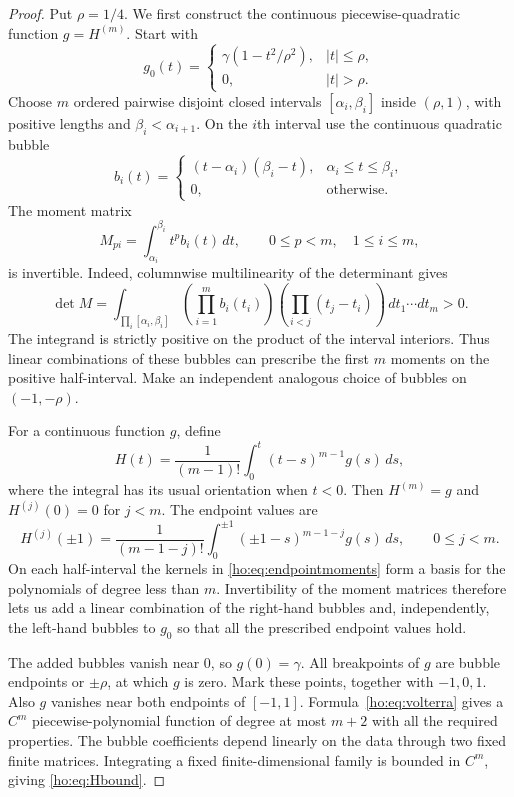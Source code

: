 \documentclass[11pt,reqno]{amsart}
\numberwithin{equation}{section}
\theoremstyle{definition}
\theoremstyle{remark}
\begin{document}
\begin{proof}
Put $\rho=1/4$. We first construct the continuous piecewise-quadratic function $g=H^{(m)}$. Start with
\[
 g_0(t)=
 \begin{cases}
 \gamma(1-t^2/\rho^2),& |t|\le\rho,\\
 0,& |t|>\rho.
 \end{cases}
\]
Choose $m$ ordered pairwise disjoint closed intervals $[\alpha_i,\beta_i]$ inside $(\rho,1)$, with positive lengths and $\beta_i<\alpha_{i+1}$. On the $i$th interval use the continuous quadratic bubble
\[
 b_i(t)=
 \begin{cases}
 (t-\alpha_i)(\beta_i-t),&\alpha_i\le t\le\beta_i,\\
 0,&\text{otherwise}.
 \end{cases}
\]
The moment matrix
\[
 M_{pi}=\int_{\alpha_i}^{\beta_i}t^p b_i(t)\,dt,
 \qquad 0\le p<m,\quad 1\le i\le m,
\]
is invertible. Indeed, columnwise multilinearity of the determinant gives
\begin{equation}\label{ho:eq:momentdet}
 \det M=\int_{\prod_i[\alpha_i,\beta_i]}
 \left(\prod_{i=1}^m b_i(t_i)\right)
 \left(\prod_{i<j}(t_j-t_i)\right)\,dt_1\cdots dt_m>0.
\end{equation}
The integrand is strictly positive on the product of the interval interiors. Thus linear combinations of these bubbles can prescribe the first $m$ moments on the positive half-interval. Make an independent analogous choice of bubbles on $(-1,-\rho)$.

For a continuous function $g$, define
\begin{equation}\label{ho:eq:volterra}
 H(t)=\frac1{(m-1)!}\int_0^t(t-s)^{m-1}g(s)\,ds,
\end{equation}
where the integral has its usual orientation when $t<0$. Then $H^{(m)}=g$ and $H^{(j)}(0)=0$ for $j<m$. The endpoint values are
\begin{equation}\label{ho:eq:endpointmoments}
 H^{(j)}(\pm1)=\frac1{(m-1-j)!}
       \int_0^{\pm1}(\pm1-s)^{m-1-j}g(s)\,ds,
 \qquad 0\le j<m.
\end{equation}
On each half-interval the kernels in \eqref{ho:eq:endpointmoments} form a basis for the polynomials of degree less than $m$. Invertibility of the moment matrices therefore lets us add a linear combination of the right-hand bubbles and, independently, the left-hand bubbles to $g_0$ so that all the prescribed endpoint values hold.

The added bubbles vanish near $0$, so $g(0)=\gamma$. All breakpoints of $g$ are bubble endpoints or $\pm\rho$, at which $g$ is zero. Mark these points, together with $-1,0,1$. Also $g$ vanishes near both endpoints of $[-1,1]$. Formula~\eqref{ho:eq:volterra} gives a $C^m$ piecewise-polynomial function of degree at most $m+2$ with all the required properties. The bubble coefficients depend linearly on the data through two fixed finite matrices. Integrating a fixed finite-dimensional family is bounded in $C^m$, giving \eqref{ho:eq:Hbound}.
\end{proof}
\end{document}
